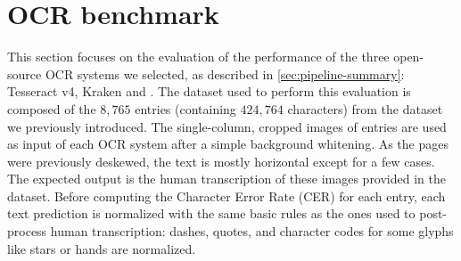 \section{OCR benchmark}
\label{sec:ocr-xp}

This section focuses on the evaluation of the performance of the three open-source OCR systems we selected, as described in \cref{sec:pipeline-summary}: Tesseract v4, Kraken and \peroocr.
The dataset used to perform this evaluation is composed of the $8,765$ entries (containing $424,764$ characters) from the dataset we previously introduced.
The single-column, cropped images of entries are used as input of each OCR system after a simple background whitening.
As the pages were previously deskewed, the text is mostly horizontal except for a few cases.
The expected output is the human transcription of these images provided in the dataset.
Before computing the Character Error Rate (CER) for each entry, each text prediction is normalized with the same basic rules as the ones used to post-process human transcription: dashes, quotes, and character codes for some glyphs like stars or hands are normalized.



